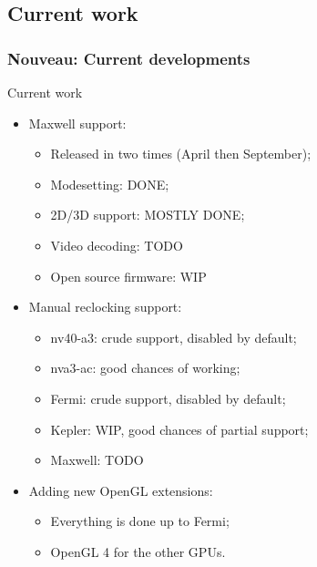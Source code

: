 \documentclass[11pt,english,compress]{beamer}
\begin{document}
\subsection{Current work}
\begin{frame}
	\frametitle{Nouveau: Current developments}

	\begin{block}{Current work}
		\begin{itemize}
			\item Maxwell support:
			\begin{itemize}
				\item Released in two times (April then September); %
				\item Modesetting: DONE;
				\item 2D/3D support: MOSTLY DONE;
				\item Video decoding: TODO
				\item Open source firmware: WIP
			\end{itemize}
			\item Manual reclocking support:
			\begin{itemize}
				\item nv40-a3: crude support, disabled by default;
				\item nva3-ac: good chances of working;
				\item Fermi: crude support, disabled by default;
				\item Kepler: WIP, good chances of partial support;
				\item Maxwell: TODO
			\end{itemize}
			\item Adding new OpenGL extensions:
			\begin{itemize}
				\item Everything is done up to Fermi;
				\item OpenGL 4 for the other GPUs.
			\end{itemize}
		\end{itemize}
	\end{block}
\end{frame}
\end{document}
